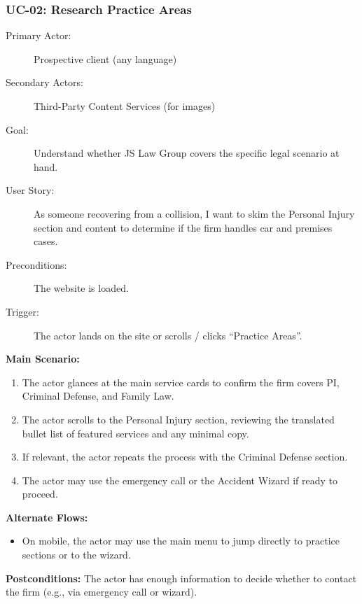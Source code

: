 \documentclass{article}
\begin{document}
\subsubsection{UC-02: Research Practice Areas}
\begin{description}
  \item[Primary Actor:] Prospective client (any language)
  \item[Secondary Actors:] Third-Party Content Services (for images)
  \item[Goal:] Understand whether JS Law Group covers the specific legal scenario at hand.
  \item[User Story:] As someone recovering from a collision, I want to skim the Personal Injury section and content to determine if the firm handles car and premises cases.
  \item[Preconditions:] The website is loaded.
  \item[Trigger:] The actor lands on the site or scrolls / clicks ``Practice Areas''.
\end{description}
\textbf{Main Scenario:}
\begin{enumerate}
  \item The actor glances at the main service cards to confirm the firm covers PI, Criminal Defense, and Family Law.
  \item The actor scrolls to the Personal Injury section, reviewing the translated bullet list of featured services and any minimal copy.
  \item If relevant, the actor repeats the process with the Criminal Defense section.
  \item The actor may use the emergency call or the Accident Wizard if ready to proceed.
\end{enumerate}
\textbf{Alternate Flows:}
\begin{itemize}
  \item On mobile, the actor may use the main menu to jump directly to practice sections or to the wizard.
\end{itemize}
\textbf{Postconditions:} The actor has enough information to decide whether to contact the firm (e.g., via emergency call or wizard).
\end{document}
